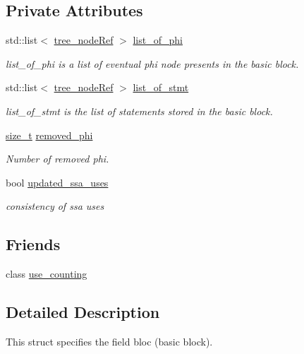 \subsection*{Private Attributes}
\begin{DoxyCompactItemize}
\item 
std\+::list$<$ \hyperlink{tree__node_8hpp_a6ee377554d1c4871ad66a337eaa67fd5}{tree\+\_\+node\+Ref} $>$ \hyperlink{structbloc_ad1d743b9975088af9f1ea77620d9c7b2}{list\+\_\+of\+\_\+phi}
\begin{DoxyCompactList}\small\item\em list\+\_\+of\+\_\+phi is a list of eventual phi node presents in the basic block. \end{DoxyCompactList}\item 
std\+::list$<$ \hyperlink{tree__node_8hpp_a6ee377554d1c4871ad66a337eaa67fd5}{tree\+\_\+node\+Ref} $>$ \hyperlink{structbloc_a87344f9a134a1b36d51448b8e24b5ed1}{list\+\_\+of\+\_\+stmt}
\begin{DoxyCompactList}\small\item\em list\+\_\+of\+\_\+stmt is the list of statements stored in the basic block. \end{DoxyCompactList}\item 
\hyperlink{tutorial__fpt__2017_2intro_2sixth_2test_8c_a7c94ea6f8948649f8d181ae55911eeaf}{size\+\_\+t} \hyperlink{structbloc_a369dac24d57af8d92c3ebf14197f926f}{removed\+\_\+phi}
\begin{DoxyCompactList}\small\item\em Number of removed phi. \end{DoxyCompactList}\item 
bool \hyperlink{structbloc_afe9b207ef643a3c86c2b915614079cd1}{updated\+\_\+ssa\+\_\+uses}
\begin{DoxyCompactList}\small\item\em consistency of ssa uses \end{DoxyCompactList}\end{DoxyCompactItemize}
\subsection*{Friends}
\begin{DoxyCompactItemize}
\item 
class \hyperlink{structbloc_a87cbb5973f5ed1249690157189f87ff5}{use\+\_\+counting}
\end{DoxyCompactItemize}


\subsection{Detailed Description}
This struct specifies the field bloc (basic block). 

